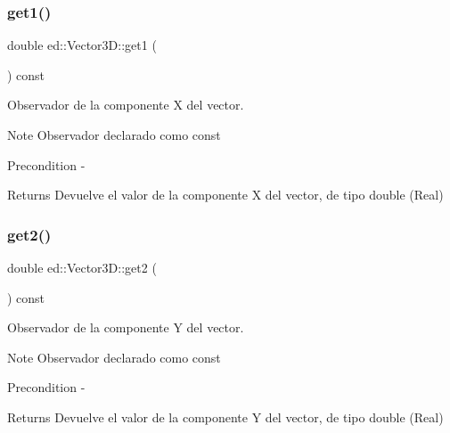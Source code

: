 \subsubsection{\texorpdfstring{get1()}{get1()}}
{\footnotesize\ttfamily double ed\+::\+Vector3\+D\+::get1 (\begin{DoxyParamCaption}{ }\end{DoxyParamCaption}) const}



Observador de la componente X del vector. 

\begin{DoxyNote}{Note}
Observador declarado como const
\end{DoxyNote}
\begin{DoxyPrecond}{Precondition}
-\/
\end{DoxyPrecond}
\begin{DoxyReturn}{Returns}
Devuelve el valor de la componente X del vector, de tipo double (Real) 
\end{DoxyReturn}
\mbox{\label{classed_1_1Vector3D_acb66f2ac0cb4f24592698fb317458e35}} 
\subsubsection{\texorpdfstring{get2()}{get2()}}
{\footnotesize\ttfamily double ed\+::\+Vector3\+D\+::get2 (\begin{DoxyParamCaption}{ }\end{DoxyParamCaption}) const}



Observador de la componente Y del vector. 

\begin{DoxyNote}{Note}
Observador declarado como const
\end{DoxyNote}
\begin{DoxyPrecond}{Precondition}
-\/
\end{DoxyPrecond}
\begin{DoxyReturn}{Returns}
Devuelve el valor de la componente Y del vector, de tipo double (Real) 
\end{DoxyReturn}
\mbox{\label{classed_1_1Vector3D_a50c08e3089bc1b0cd5de77d8f0086cc0}} 
